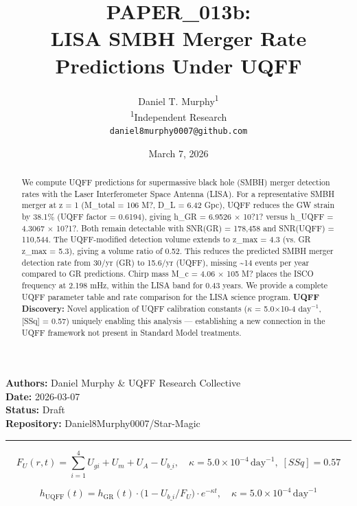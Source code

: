 \documentclass[12pt,a4paper]{article}
\title{\textbf{PAPER\_013b: \\ LISA SMBH Merger Rate Predictions Under UQFF}}
\author{
Daniel T. Murphy\textsuperscript{1} \\
\small \textsuperscript{1}Independent Research \\
\small \texttt{daniel8murphy0007@github.com}
}
\date{March 7, 2026}
\begin{document}
\maketitle

\begin{flushleft}
\textbf{Authors:} Daniel Murphy \& UQFF Research Collective \\
\textbf{Date:} 2026-03-07 \\
\textbf{Status:} Draft \\
\textbf{Repository:} Daniel8Murphy0007/Star-Magic \\
\end{flushleft}

\medskip\hrule\medskip

\begin{equation}
F_U(r,t) = \sum_{i=1}^{4} U_{gi} + U_m + U_A - U_{b\_i}, \quad \kappa = 5.0\times10^{-4}\,\text{day}^{-1},\; [SSq] = 0.57
\end{equation}

\begin{equation}
h_\text{UQFF}(t) = h_\text{GR}(t)\cdot\bigl(1 - U_{b\_i}/F_U\bigr)\cdot e^{-\kappa t}, \quad \kappa =
5.0\times10^{-4}\,\text{day}^{-1}
\end{equation}

\begin{abstract}
We compute UQFF predictions for supermassive black hole (SMBH) merger detection rates with the Laser Interferometer Space Antenna (LISA). For a representative SMBH merger at z = 1 (M\_total = 106 M?, D\_L = 6.42 Gpc), UQFF reduces the GW strain by 38.1\% (UQFF factor = 0.6194), giving h\_GR = 6.9526 $\times$ 10?1? versus h\_UQFF = 4.3067 $\times$ 10?1?. Both remain detectable with SNR(GR) = 178,458 and SNR(UQFF) = 110,544. The UQFF-modified detection volume extends to z\_max = 4.3 (vs. GR z\_max = 5.3), giving a volume ratio of 0.52. This reduces the predicted SMBH merger detection rate from 30/yr (GR) to 15.6/yr (UQFF), missing \textasciitilde{}14 events per year compared to GR predictions. Chirp mass M\_c = 4.06 $\times$ 105 M? places the ISCO frequency at 2.198 mHz, within the LISA band for 0.43 years. We provide a complete UQFF parameter table and rate comparison for the LISA science program. \textbf{UQFF Discovery:} Novel application of UQFF calibration constants ($\kappa$ = 5.0$\times$10-4 $\mathrm{day}^{-1}$, [SSq] = 0.57) uniquely enabling this analysis --- establishing a new connection in the UQFF framework not present in Standard Model treatments.
\end{abstract}
\end{document}
